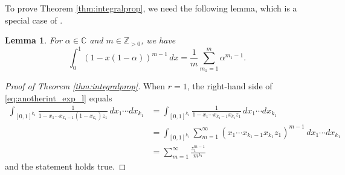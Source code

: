 \documentclass[12pt,a4paper]{article}
\newtheorem{lemma}[defi]{Lemma}
\theoremstyle{remark}
\begin{document}
To prove Theorem \ref{thm:integralprop}, we need the 
following lemma, which is a special case of 
\cite[Lemma 2.1]{Li}.
\begin{lemma}\label{lemma:integration_lemma}
For $\alpha\in\mathbb{C}$ and $m \in\mathbb{Z}_{>0}$, we have
\[ \int_0^1 (1-x(1-\alpha))^{m-1} \, dx
=  \frac{1}{m}\sum_{m_1=1}^m \alpha^{m_1-1}.\]  
\end{lemma}

\begin{proof}[Proof of Theorem \ref{thm:integralprop}]
When $r=1$,
the right-hand side of 
\eqref{eq:anotherint_exp_l} equals 
\begin{align*}
\int_{[0,1]^{k_1}}
\frac{1}{1-x_1\cdots x_{k_1-1}(1-x_{k_1})z_1}\, dx_1\cdots 
dx_{k_1}
&=
\int_{[0,1]^{k_1}}
\frac{1}{1-x_1\cdots x_{k_1-1}x_{k_1}z_1}\, dx_1\cdots 
dx_{k_1}\\
&=
\int_{[0,1]^{k_1}}
\sum_{m=1}^{\infty}
(x_1\cdots x_{k_1-1}x_{k_1}z_1)^{m-1}\, dx_1\cdots 
dx_{k_1}\\
&=\sum_{m=1}^{\infty} \frac{z_1^{m-1}}{m^{k_1}}
\end{align*}
and the statement holds true.


\end{proof}
\end{document}
